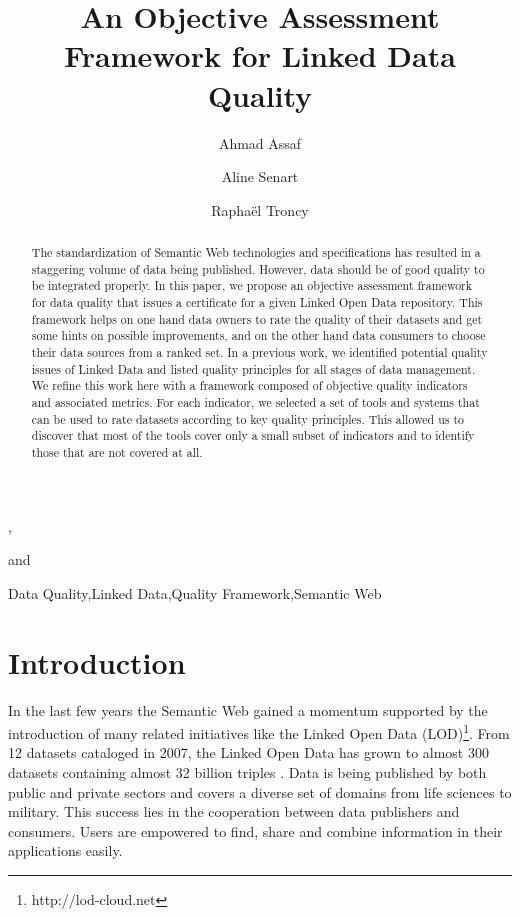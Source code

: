 \documentclass[onecolumn, crcready]{iosart2c}
\begin{document}
\begin{frontmatter}     

\title{An Objective Assessment Framework for Linked Data Quality} 
\author[A]{Ahmad Assaf},\author[A]{Aline Senart} and
\author[B]{Raphaël Troncy} 
\address[A]{SAP Research, SAP Labs France SAS,\\
805 avenue du Dr. Maurice Donat, BP 1216, 06254 Mougins Cedex, France\\
}
\address[B]{EURECOM,\\
2229 route des cretes, 06560 Sophia Antipolis, France\\
}


\begin{abstract}
The standardization of Semantic Web technologies and specifications has resulted in a staggering volume of data being published. However, data should be of good quality to be integrated properly. In this paper, we propose an objective assessment framework for data quality that issues a certificate for a given Linked Open Data repository. This framework helps on one hand data owners to rate the quality of their datasets and get some hints on possible improvements, and on the other hand data consumers to choose their data sources from a ranked set. In a previous work, we identified potential quality issues of Linked Data and listed quality principles for all stages of data management. We refine this work here with a framework composed of objective quality indicators and associated metrics. For each indicator, we selected a set of tools and systems that can be used to rate datasets according to key quality principles. This allowed us to discover that most of the tools cover only a small subset of indicators and to identify those that are not covered at all.
\end{abstract}
\begin{keyword}
Data Quality\sep Linked Data\sep Quality Framework\sep Semantic Web
\end{keyword}
\end{frontmatter}

\section{Introduction}
In the last few years the Semantic Web gained a momentum supported by the introduction of many related initiatives like the Linked Open Data (LOD)\footnote{http://lod-cloud.net}. From 12 datasets cataloged in 2007, the Linked Open Data has grown to almost 300 datasets containing almost 32 billion triples \cite{bizer2011}. Data is being published by both public and private sectors and covers a diverse set of domains from life sciences to military. This success lies in the cooperation between data publishers and consumers. Users are empowered to find, share and combine information in their applications easily.
\end{document}
